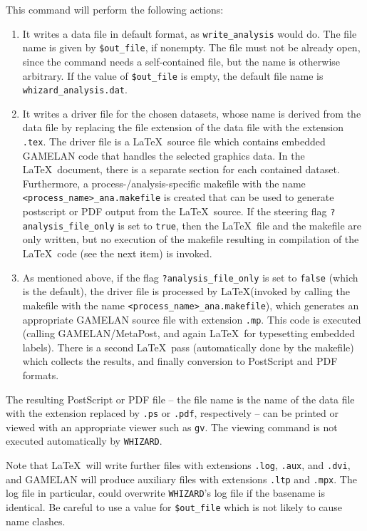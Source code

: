 \documentclass[12pt]{book}
\newcommand{\ttt}[1]{\texttt{#1}}
\newcommand{\whizard}{\ttt{WHIZARD}}
\begin{document}
This command will perform the following actions:
\begin{enumerate}
\item
  It writes a data file in default format, as \ttt{write\_analysis} would do.
  The file name is given by \ttt{\$out\_file}, if nonempty.  The file must not
  be already open, since the command needs a self-contained file, but the name
  is otherwise arbitrary.  If the value of \ttt{\$out\_file} is empty, the
  default file name is \ttt{whizard\_analysis.dat}.
\item
  It writes a driver file for the chosen datasets, whose name is derived from
  the data file by replacing the file extension of the data file with the
  extension \ttt{.tex}.  The driver file is a \LaTeX\ source file which
  contains embedded GAMELAN code that handles the selected graphics data.  In
  the \LaTeX\ document, there is a separate section for each contained
  dataset. Furthermore, a process-/analysis-specific makefile with the
  name \ttt{<process\_name>\_ana.makefile} is created that can be used
  to generate postscript or PDF output from the \LaTeX\ source. If the
  steering flag \ttt{?analysis\_file\_only} is set to \ttt{true}, then
  the \LaTeX\ file and the makefile are only written, but no execution
  of the makefile resulting in compilation of the \LaTeX\ code (see
  the next item) is invoked.
\item
  As mentioned above, if the flag \ttt{?analysis\_file\_only} is set
  to \ttt{false} (which is the default), the driver file is processed
  by \LaTeX (invoked by calling the makefile with the name
  \ttt{<process\_name>\_ana.makefile}), which generates an appropriate
  GAMELAN source file with extension \ttt{.mp}.  This code is executed
  (calling GAMELAN/MetaPost, and again \LaTeX\ for typesetting embedded
  labels).  There is a second \LaTeX\ pass (automatically done by the
  makefile) which collects the results, and finally conversion to
  PostScript and PDF formats.
\end{enumerate}

The resulting PostScript or PDF file -- the file name is the name of the data
file with the extension replaced by \ttt{.ps} or \ttt{.pdf}, respectively
-- can be printed or viewed with an appropriate viewer such as \ttt{gv}.  The
viewing command is not executed automatically by \whizard.

Note that \LaTeX\ will write further files with extensions \ttt{.log},
\ttt{.aux}, and \ttt{.dvi}, and GAMELAN will produce auxiliary files with
extensions \ttt{.ltp} and \ttt{.mpx}. The log file in particular, could
overwrite \whizard's log file if the basename is identical.  Be careful to use
a value for \ttt{\$out\_file} which is not likely to cause name clashes.
\end{document}
